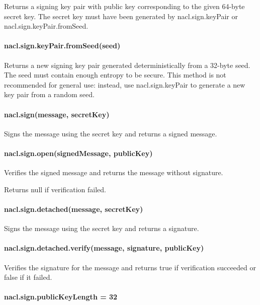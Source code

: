Returns a signing key pair with public key corresponding to the given 64-\/byte secret key. The secret key must have been generated by {\ttfamily nacl.\+sign.\+key\+Pair} or {\ttfamily nacl.\+sign.\+key\+Pair.\+from\+Seed}.

\paragraph*{nacl.\+sign.\+key\+Pair.\+from\+Seed(seed)}

Returns a new signing key pair generated deterministically from a 32-\/byte seed. The seed must contain enough entropy to be secure. This method is not recommended for general use\+: instead, use {\ttfamily nacl.\+sign.\+key\+Pair} to generate a new key pair from a random seed.

\paragraph*{nacl.\+sign(message, secret\+Key)}

Signs the message using the secret key and returns a signed message.

\paragraph*{nacl.\+sign.\+open(signed\+Message, public\+Key)}

Verifies the signed message and returns the message without signature.

Returns {\ttfamily null} if verification failed.

\paragraph*{nacl.\+sign.\+detached(message, secret\+Key)}

Signs the message using the secret key and returns a signature.

\paragraph*{nacl.\+sign.\+detached.\+verify(message, signature, public\+Key)}

Verifies the signature for the message and returns {\ttfamily true} if verification succeeded or {\ttfamily false} if it failed.

\paragraph*{nacl.\+sign.\+public\+Key\+Length = 32}

